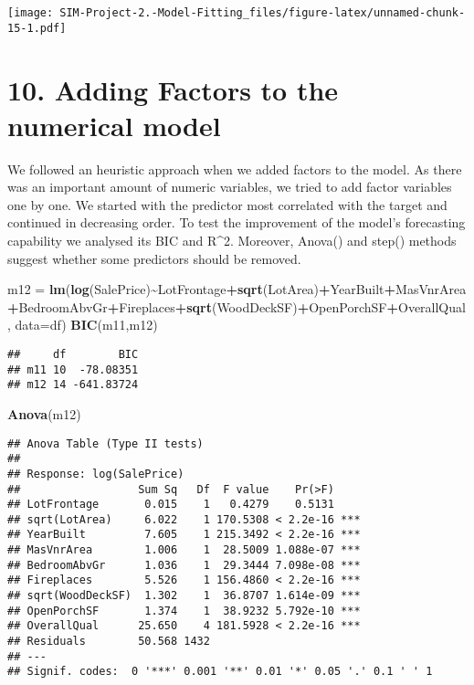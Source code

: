 \documentclass[
]{article}
\newenvironment{Shaded}{\begin{snugshade}}{\end{snugshade}}
\newcommand{\AttributeTok}[1]{\textcolor[rgb]{0.13,0.29,0.53}{#1}}
\newcommand{\FunctionTok}[1]{\textcolor[rgb]{0.13,0.29,0.53}{\textbf{#1}}}
\newcommand{\NormalTok}[1]{#1}
\newcommand{\OtherTok}[1]{\textcolor[rgb]{0.56,0.35,0.01}{#1}}
\newcommand{\SpecialCharTok}[1]{\textcolor[rgb]{0.81,0.36,0.00}{\textbf{#1}}}
\begin{document}
\texttt{[image: SIM-Project-2.-Model-Fitting\_files/figure-latex/unnamed-chunk-15-1.pdf]}

\hypertarget{adding-factors-to-the-numerical-model}{%
\section{10. Adding Factors to the numerical
model}\label{adding-factors-to-the-numerical-model}}

We followed an heuristic approach when we added factors to the model. As
there was an important amount of numeric variables, we tried to add
factor variables one by one. We started with the predictor most
correlated with the target and continued in decreasing order. To test
the improvement of the model's forecasting capability we analysed its
BIC and R\^{}2. Moreover, Anova() and step() methods suggest whether
some predictors should be removed.

\begin{Shaded}
\begin{Highlighting}[]
\NormalTok{m12 }\OtherTok{=} \FunctionTok{lm}\NormalTok{(}\FunctionTok{log}\NormalTok{(SalePrice)}\SpecialCharTok{\textasciitilde{}}\NormalTok{LotFrontage}\SpecialCharTok{+}\FunctionTok{sqrt}\NormalTok{(LotArea)}\SpecialCharTok{+}\NormalTok{YearBuilt}\SpecialCharTok{+}\NormalTok{MasVnrArea}
         \SpecialCharTok{+}\NormalTok{BedroomAbvGr}\SpecialCharTok{+}\NormalTok{Fireplaces}\SpecialCharTok{+}\FunctionTok{sqrt}\NormalTok{(WoodDeckSF)}\SpecialCharTok{+}\NormalTok{OpenPorchSF}\SpecialCharTok{+}\NormalTok{OverallQual, }\AttributeTok{data=}\NormalTok{df)}
\FunctionTok{BIC}\NormalTok{(m11,m12)}
\end{Highlighting}
\end{Shaded}

\begin{verbatim}
##     df        BIC
## m11 10  -78.08351
## m12 14 -641.83724
\end{verbatim}

\begin{Shaded}
\begin{Highlighting}[]
\FunctionTok{Anova}\NormalTok{(m12)}
\end{Highlighting}
\end{Shaded}

\begin{verbatim}
## Anova Table (Type II tests)
## 
## Response: log(SalePrice)
##                  Sum Sq   Df  F value    Pr(>F)    
## LotFrontage       0.015    1   0.4279    0.5131    
## sqrt(LotArea)     6.022    1 170.5308 < 2.2e-16 ***
## YearBuilt         7.605    1 215.3492 < 2.2e-16 ***
## MasVnrArea        1.006    1  28.5009 1.088e-07 ***
## BedroomAbvGr      1.036    1  29.3444 7.098e-08 ***
## Fireplaces        5.526    1 156.4860 < 2.2e-16 ***
## sqrt(WoodDeckSF)  1.302    1  36.8707 1.614e-09 ***
## OpenPorchSF       1.374    1  38.9232 5.792e-10 ***
## OverallQual      25.650    4 181.5928 < 2.2e-16 ***
## Residuals        50.568 1432                       
## ---
## Signif. codes:  0 '***' 0.001 '**' 0.01 '*' 0.05 '.' 0.1 ' ' 1
\end{verbatim}
\end{document}
